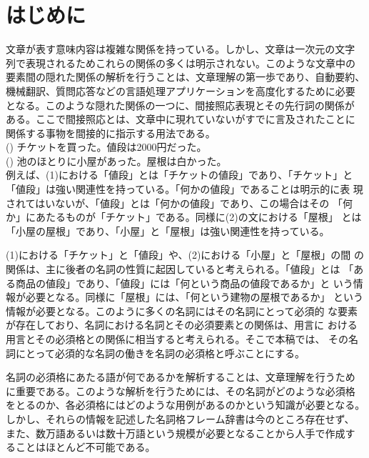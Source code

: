 \documentclass{nlp}
\begin{document}
 \section{はじめに}

 文章が表す意味内容は複雑な関係を持っている。しかし、文章は一次元の文字
 列で表現されるためこれらの関係の多くは明示されない。このような文章中の
 要素間の隠れた関係の解析を行うことは、文章理解の第一歩であり、自動要約、
 機械翻訳、質問応答などの言語処理アプリケーションを高度化するために必要
 となる。このような隠れた関係の一つに、間接照応表現とその先行詞の関係が
 ある。ここで間接照応とは、文章中に現れていないがすでに言及されたことに
 関係する事物を間接的に指示する用法である。
 \vspace{1ex}\\
 \hspace{1em}(\theexample)
 チケットを買った。値段は2000円だった。\vspace{1ex}\\
 \hspace{1em}(\theexample)
 池のほとりに小屋があった。屋根は白かった。\vspace{1ex}\\
 例えば、(1)における「値段」とは「チケットの値段」であり、「チケット」と
 「値段」は強い関連性を持っている。「何かの値段」であることは明示的に表
 現されてはいないが、「値段」とは「何かの値段」であり、この場合はその
 「何か」にあたるものが「チケット」である。同様に(2)の文における「屋根」
 とは「小屋の屋根」であり、「小屋」と「屋根」は強い関連性を持っている。

 (1)における「チケット」と「値段」や、(2)における「小屋」と「屋根」の間
 の関係は、主に後者の名詞の性質に起因していると考えられる。「値段」とは
 「ある商品の値段」であり、「値段」には「何という商品の値段であるか」と
 いう情報が必要となる。同様に「屋根」には、「何という建物の屋根であるか」
 という情報が必要となる。このように多くの名詞にはその名詞にとって必須的
 な要素が存在しており、名詞における名詞とその必須要素との関係は、用言に
 おける用言とその必須格との関係に相当すると考えられる。そこで本稿では、
 その名詞にとって必須的な名詞の働きを名詞の必須格と呼ぶことにする。
 
 名詞の必須格にあたる語が何であるかを解析することは、文章理解を行うため
 に重要である。このような解析を行うためには、その名詞がどのような必須格
 をとるのか、各必須格にはどのような用例があるのかという知識が必要となる。
 しかし、それらの情報を記述した名詞格フレーム辞書は今のところ存在せず、
 また、数万語あるいは数十万語という規模が必要となることから人手で作成す
 ることはほとんど不可能である。
 
\end{document}
